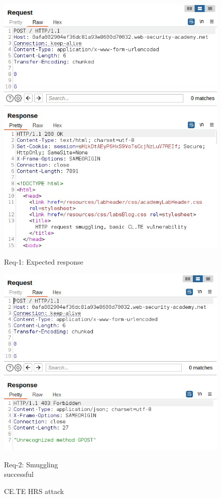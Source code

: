 \documentclass[conference]{IEEEtran}
\begin{document}
\begin{figure}[htbp]
	\centering
	\begin{minipage}[c]{0.45\linewidth}
	  \centering
	  \includegraphics[width=\linewidth]{results/CL.TE_req1_OK_response.jpeg}
	  \caption*{Req-1: Expected response}
	  \label{fig:ce.te_req1_ok}
	\end{minipage}
	\hfill
	\begin{minipage}[c]{0.45\linewidth}
	  \centering
	  \includegraphics[width=\linewidth]{results/CL.TE_req2_GPOST_invalid.jpeg}
	  \captionsetup{justification=centering}
	  \caption*{Req-2: Smuggling \\ successful}
	  \label{fig:ce.te_req2_gpost}
	\end{minipage}
  
	\caption{CE.TE HRS attack}
	\label{fig:ce.te}
  \end{figure}
\end{document}
